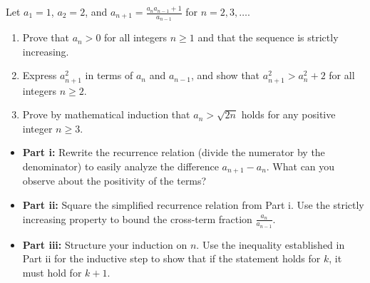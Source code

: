 \begin{problem}
Let $a_1 = 1$, $a_2 = 2$, and $a_{n+1} = \frac{a_n a_{n-1} + 1}{a_{n-1}}$ for $n = 2, 3, \dots$. 
\begin{enumerate}
    \item[\textbf{i)}] Prove that $a_n > 0$ for all integers $n \ge 1$ and that the sequence is strictly increasing.
    \item[\textbf{ii)}] Express $a_{n+1}^2$ in terms of $a_n$ and $a_{n-1}$, and show that $a_{n+1}^2 > a_n^2 + 2$ for all integers $n \ge 2$.
    \item[\textbf{iii)}] Prove by mathematical induction that $a_n > \sqrt{2n}$ holds for any positive integer $n \ge 3$.
\end{enumerate}
\end{problem}

\begin{hint}
\begin{itemize}
    \item \textbf{Part i:} Rewrite the recurrence relation (divide the numerator by the denominator) to easily analyze the difference $a_{n+1} - a_n$. What can you observe about the positivity of the terms?
    \item \textbf{Part ii:} Square the simplified recurrence relation from Part i. Use the strictly increasing property to bound the cross-term fraction $\frac{a_n}{a_{n-1}}$.
    \item \textbf{Part iii:} Structure your induction on $n$. Use the inequality established in Part ii for the inductive step to show that if the statement holds for $k$, it must hold for $k+1$. 
\end{itemize}
\end{hint}

